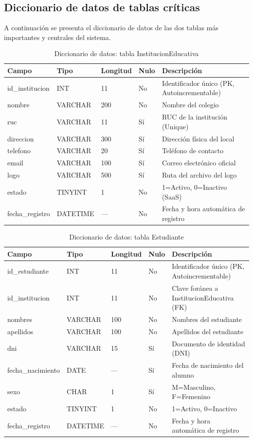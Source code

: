 \documentclass[12pt,a4paper,oneside]{report}
\begin{document}
\subsection{Diccionario de datos de tablas críticas}
A continuación se presenta el diccionario de datos de las dos tablas más importantes y centrales del sistema.

\begin{table}[H]
\centering
\caption{Diccionario de datos: tabla InstitucionEducativa}
\label{tab:dic_inst}
\begin{tabularx}{\textwidth}{llllX}
\toprule
Campo & Tipo & Longitud & Nulo & Descripción \\
\midrule
id\_institucion & INT & 11 & No & Identificador único (PK, Autoincrementable) \\
nombre & VARCHAR & 200 & No & Nombre del colegio \\
ruc & VARCHAR & 11 & Sí & RUC de la institución (Unique) \\
direccion & VARCHAR & 300 & Sí & Dirección física del local \\
telefono & VARCHAR & 20 & Sí & Teléfono de contacto \\
email & VARCHAR & 100 & Sí & Correo electrónico oficial \\
logo & VARCHAR & 500 & Sí & Ruta del archivo del logo \\
estado & TINYINT & 1 & No & 1=Activo, 0=Inactivo (SaaS) \\
fecha\_registro & DATETIME & --- & No & Fecha y hora automática de registro \\
\bottomrule
\end{tabularx}
\end{table}

\begin{table}[H]
\centering
\caption{Diccionario de datos: tabla Estudiante}
\label{tab:dic_est}
\begin{tabularx}{\textwidth}{llllX}
\toprule
Campo & Tipo & Longitud & Nulo & Descripción \\
\midrule
id\_estudiante & INT & 11 & No & Identificador único (PK, Autoincrementable) \\
id\_institucion & INT & 11 & No & Clave foránea a InstitucionEducativa (FK) \\
nombres & VARCHAR & 100 & No & Nombres del estudiante \\
apellidos & VARCHAR & 100 & No & Apellidos del estudiante \\
dni & VARCHAR & 15 & Sí & Documento de identidad (DNI) \\
fecha\_nacimiento & DATE & --- & Sí & Fecha de nacimiento del alumno \\
sexo & CHAR & 1 & Sí & M=Masculino, F=Femenino \\
estado & TINYINT & 1 & No & 1=Activo, 0=Inactivo \\
fecha\_registro & DATETIME & --- & No & Fecha y hora automática de registro \\
\bottomrule
\end{tabularx}
\end{table}
\end{document}
